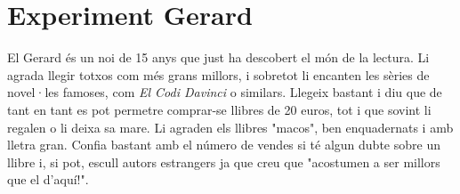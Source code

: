 
\section{Experiment Gerard}

El Gerard és un noi de 15 anys que just ha descobert el món de la lectura. Li agrada llegir totxos com més grans millors, i sobretot li encanten les sèries de novel·les famoses, com \emph{El Codi Davinci} o similars. Llegeix bastant i diu que de tant en tant es pot permetre comprar-se llibres de 20 euros, tot i que sovint li regalen o li deixa sa mare. Li agraden els llibres "macos", ben enquadernats i amb lletra gran. Confia bastant amb el número de vendes si té algun dubte sobre un llibre i, si pot, escull autors estrangers ja que creu que "acostumen a ser millors que el d'aquí!".

